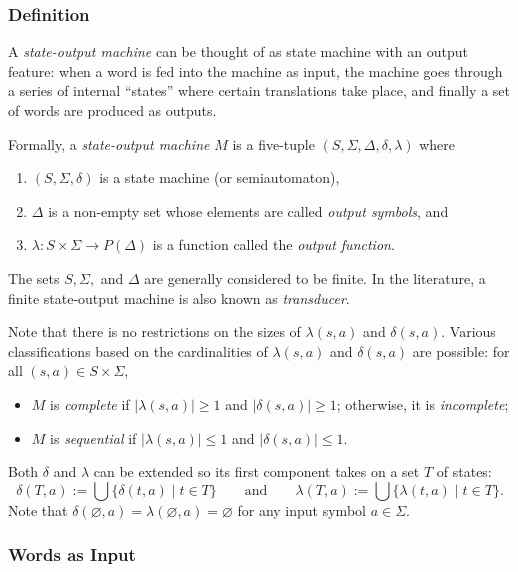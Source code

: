 \documentclass[12pt]{article}
\begin{document}
\subsubsection*{Definition}

A \emph{state-output machine} can be thought of as state machine with an output feature: when a word is fed into the machine as input, the machine goes through a series of internal ``states'' where certain translations take place, and finally a set of words are produced as outputs.

Formally, a \emph{state-output machine} $M$ is a five-tuple $(S,\Sigma,\Delta, \delta,\lambda)$ where
\begin{enumerate}
\item $(S,\Sigma,\delta)$ is a state machine (or semiautomaton),
\item $\Delta$ is a non-empty set whose elements are called \emph{output symbols}, and
\item $\lambda: S\times \Sigma \to P(\Delta)$ is a function called the \emph{output function}.
\end{enumerate}
The sets $S,\Sigma,$ and $\Delta$ are generally considered to be finite.  In the literature, a finite state-output machine is also known as \emph{transducer}.

Note that there is no restrictions on the sizes of $\lambda(s,a)$ and $\delta(s,a)$.  Various classifications based on the cardinalities of $\lambda(s,a)$ and $\delta(s,a)$ are possible: for all $(s,a)\in S\times \Sigma$,
\begin{itemize}
\item $M$ is \emph{complete} if $|\lambda(s,a)|\ge 1$ and $|\delta(s,a)|\ge 1$; otherwise, it is \emph{incomplete};  
\item $M$ is \emph{sequential} if $|\lambda(s,a)|\le 1$ and $|\delta(s,a)|\le 1$.
\end{itemize}

Both $\delta$ and $\lambda$ can be extended so its first component takes on a set $T$ of states: $$\delta(T,a):=\bigcup \lbrace \delta(t,a)\mid t\in T\rbrace \qquad \mbox{and} \qquad \lambda(T,a):=\bigcup \lbrace \lambda(t,a)\mid t\in T\rbrace.$$  Note that $\delta(\varnothing,a)=\lambda(\varnothing,a)=\varnothing$ for any input symbol $a\in \Sigma$.

\subsubsection*{Words as Input}
\end{document}
